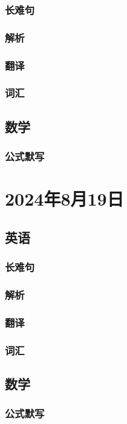\documentclass[UTF8]{ctexart}
\begin{document}
\subsubsection{长难句}
\subsubsection{解析}
\subsubsection{翻译}
\subsubsection{词汇}
\subsection{数学}
\subsubsection{公式默写}
\begin{multicols}{2}
\end{multicols}
\section{2024年8月19日}
\subsection{英语}
\subsubsection{长难句}
\subsubsection{解析}
\subsubsection{翻译}
\subsubsection{词汇}
\subsection{数学}
\subsubsection{公式默写}
\begin{multicols}{2}
\end{multicols}
\end{document}
